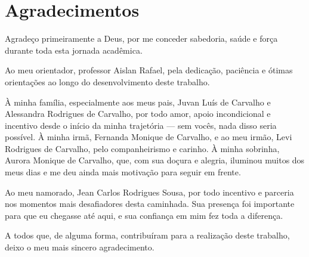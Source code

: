 \chapter*{Agradecimentos}

Agradeço primeiramente a Deus, por me conceder sabedoria, saúde e força durante toda esta jornada acadêmica.

Ao meu orientador, professor Aislan Rafael, pela dedicação, paciência e ótimas orientações ao longo do desenvolvimento deste trabalho.

À minha família, especialmente aos meus pais, Juvan Luís de Carvalho e Alessandra Rodrigues de Carvalho, por todo amor, apoio incondicional e incentivo desde o início da minha trajetória — sem vocês, nada disso seria possível. À minha irmã, Fernanda Monique de Carvalho, e ao meu irmão, Levi Rodrigues de Carvalho, pelo companheirismo e carinho. À minha sobrinha, Aurora Monique de Carvalho, que, com sua doçura e alegria, iluminou muitos dos meus dias e me deu ainda mais motivação para seguir em frente.

Ao meu namorado, Jean Carlos Rodrigues Sousa, por todo incentivo e parceria nos momentos mais desafiadores desta caminhada. Sua presença foi importante para que eu chegasse até aqui, e sua confiança em mim fez toda a diferença.

A todos que, de alguma forma, contribuíram para a realização deste trabalho, deixo o meu mais sincero agradecimento.
